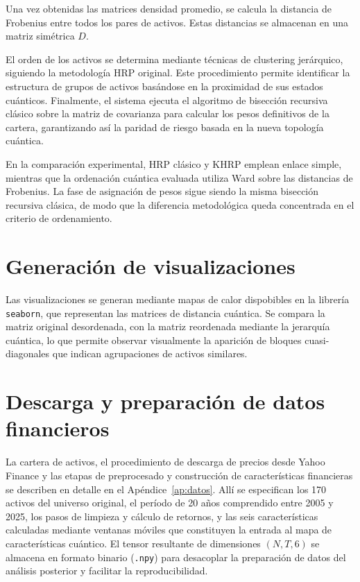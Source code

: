Una vez obtenidas las matrices densidad promedio, se calcula la distancia de Frobenius entre todos los pares de activos. Estas distancias se almacenan en una matriz simétrica $D$.

El orden de los activos se determina mediante técnicas de clustering jerárquico, siguiendo la metodología \gls{HRP} original. Este procedimiento permite identificar la estructura de grupos de activos basándose en la proximidad de sus estados cuánticos. Finalmente, el sistema ejecuta el algoritmo de bisección recursiva clásico sobre la matriz de covarianza para calcular los pesos definitivos de la cartera, garantizando así la paridad de riesgo basada en la nueva topología cuántica.

En la comparación experimental, \gls{HRP} clásico y \gls{KHRP} emplean enlace simple, mientras que la ordenación cuántica evaluada utiliza Ward sobre las distancias de Frobenius. La fase de asignación de pesos sigue siendo la misma bisección recursiva clásica, de modo que la diferencia metodológica queda concentrada en el criterio de ordenamiento.

\section{Generación de visualizaciones}
\label{sec:generacion_visualizaciones}

Las visualizaciones se generan mediante mapas de calor dispobibles en la librería \texttt{seaborn}, que representan las matrices de distancia cuántica. Se compara la matriz original desordenada, con la matriz reordenada mediante la jerarquía cuántica, lo que permite observar visualmente la aparición de bloques cuasi-diagonales que indican agrupaciones de activos similares.

\section{Descarga y preparación de datos financieros}
\label{sec:descarga_preparacion_datos}

La cartera de activos, el procedimiento de descarga de precios desde Yahoo Finance y las etapas de preprocesado y construcción de características financieras se describen en detalle en el Apéndice~\ref{ap:datos}. Allí se especifican los 170 activos del universo original, el período de 20 años comprendido entre 2005 y 2025, los pasos de limpieza y cálculo de retornos, y las seis características calculadas mediante ventanas móviles que constituyen la entrada al mapa de características cuántico. El tensor resultante de dimensiones $(N, T, 6)$ se almacena en formato binario (\texttt{.npy}) para desacoplar la preparación de datos del análisis posterior y facilitar la reproducibilidad.
